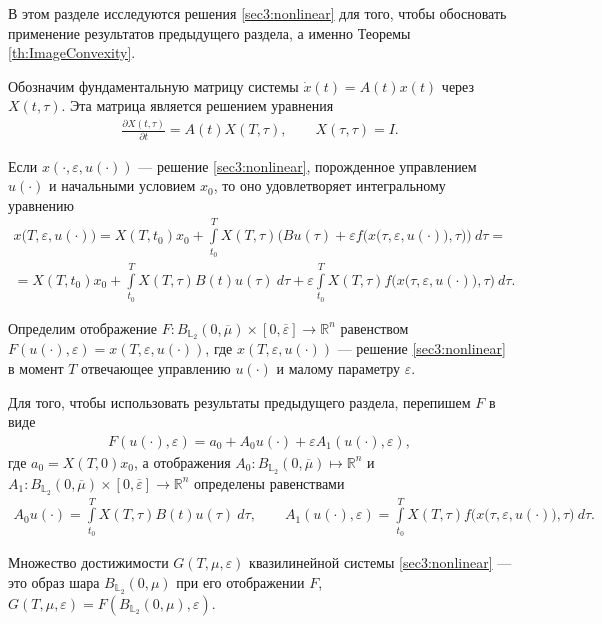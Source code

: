 \documentclass[../main.tex]{subfiles}
\begin{document}
В этом разделе исследуются решения \eqref{sec3:nonlinear} для того, чтобы обосновать применение результатов предыдущего раздела, а именно Теоремы \ref{th:ImageConvexity}. 

Обозначим фундаментальную матрицу системы $\dot{x}(t) = A(t) x(t)$ через $X(t,\tau)$.
Эта матрица является решением уравнения
\begin{gather*}
	\frac{\partial X(t,\tau)}{\partial t} = A(t) X(T,\tau), \qquad X(\tau,\tau) = I.
\end{gather*}

Если $x(\cdot,\varepsilon, u(\cdot))$ --- решение \eqref{sec3:nonlinear}, порожденное управлением $u(\cdot)$ и начальными условием $x_0$,  то оно удовлетворяет интегральному уравнению
\begin{gather*}
	x\big(T,\varepsilon, u(\cdot)\big) =
	X(T,t_0)x_0 + 
	\int\limits_{t_0}^T X(T,\tau) \bigg(Bu(\tau) +
	\varepsilon f\Big(x\big(\tau,\varepsilon, u(\cdot)\big),\tau\Big) \bigg)\ d\tau = \\ =
	X(T,t_0)x_0 +
	\int\limits_{t_0}^T X(T,\tau) B(t)u(\tau)\ d\tau 
	+ \varepsilon \int\limits_{t_0}^T X(T,\tau) f\Big(x\big(\tau,\varepsilon, u(\cdot)\big),\tau\Big) \ d\tau.
\end{gather*}

Определим отображение $F:B_{\mathbb{L}_2}(0,\overline{\mu})\times [0,\overline{\varepsilon}] \to \mathbb{R}^n$ равенством $F(u(\cdot),\varepsilon) = x(T,\varepsilon,u(\cdot))$, где $x(T,\varepsilon,u(\cdot))$ --- решение \eqref{sec3:nonlinear} в момент $T$ отвечающее управлению $u(\cdot)$ и малому параметру $\varepsilon$.

Для того, чтобы использовать результаты предыдущего раздела, перепишем  $F$ в виде
\begin{gather*}
	F(u(\cdot),\varepsilon) = a_0 + A_0 u(\cdot) + \varepsilon A_1(u(\cdot), \varepsilon), 
\end{gather*}
где $a_0 = X(T,0)x_0 $, а отображения $A_0: B_{\mathbb{L}_2}(0,\overline{\mu})  \mapsto \mathbb{R}^n$ и $A_1: B_{\mathbb{L}_2}(0,\overline{\mu}) \times [0,\overline{\varepsilon}] \to \mathbb{R}^n$ определены равенствами
\begin{gather}\label{A1_def}
	A_0 u(\cdot) = \int\limits_{t_0}^T X(T,\tau) B(t)u(\tau)\ d\tau, \qquad
	A_1(u(\cdot),\varepsilon) = \int\limits_{t_0}^T X(T,\tau) f\Big(x\big(\tau,\varepsilon, u(\cdot)\big),\tau\Big) \ d\tau.
\end{gather}

Множество достижимости $G(T,\mu,\varepsilon) $  квазилинейной системы \eqref{sec3:nonlinear} --- это образ шара $B_{\mathbb{L}_2}(0,\mu)$ при его отображении $F$, $G(T,\mu,\varepsilon) = F(B_{\mathbb{L}_2}(0,\mu),\varepsilon)$.
\end{document}
